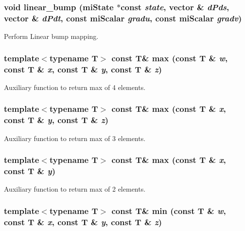 \subsubsection{\setlength{\rightskip}{0pt plus 5cm}void linear\_\-bump (mi\-State $\ast$const {\em state}, vector \& {\em d\-Pds}, vector \& {\em d\-Pdt}, const mi\-Scalar {\em gradu}, const mi\-Scalar {\em gradv})\hspace{0.3cm}{\tt  [inline]}}\label{namespacemr_a17}


Perform Linear bump mapping. 

\subsubsection{\setlength{\rightskip}{0pt plus 5cm}template$<$typename T$>$ const T\& max (const T \& {\em w}, const T \& {\em x}, const T \& {\em y}, const T \& {\em z})\hspace{0.3cm}{\tt  [inline]}}\label{namespacemr_a58}


Auxiliary function to return max of 4 elements. 

\subsubsection{\setlength{\rightskip}{0pt plus 5cm}template$<$typename T$>$ const T\& max (const T \& {\em x}, const T \& {\em y}, const T \& {\em z})\hspace{0.3cm}{\tt  [inline]}}\label{namespacemr_a57}


Auxiliary function to return max of 3 elements. 

\subsubsection{\setlength{\rightskip}{0pt plus 5cm}template$<$typename T$>$ const T\& max (const T \& {\em x}, const T \& {\em y})\hspace{0.3cm}{\tt  [inline]}}\label{namespacemr_a56}


Auxiliary function to return max of 2 elements. 

\subsubsection{\setlength{\rightskip}{0pt plus 5cm}template$<$typename T$>$ const T\& min (const T \& {\em w}, const T \& {\em x}, const T \& {\em y}, const T \& {\em z})\hspace{0.3cm}{\tt  [inline]}}\label{namespacemr_a55}


